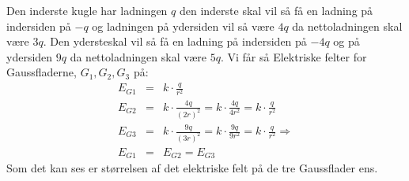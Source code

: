 Den inderste kugle har ladningen $q$ den inderste skal vil så få en ladning på indersiden på $-q$ og ladningen på ydersiden vil så være $4q$ da nettoladningen skal være $3q$. Den ydersteskal vil så få en ladning på indersiden på $-4q$ og på ydersiden $9q$ da nettoladningen skal være $5q$. Vi får så Elektriske felter for Gaussfladerne, $G_1, G_2, G_3$ på:
\begin{eqnarray}
	E_{G1} &=& k \cdot \frac{q}{r^2} \nonumber \\
	E_{G2} &=& k \cdot \frac{4q}{(2r)^2} = k \cdot \frac{4q}{4r^2} = k \cdot \frac{q}{r^2} \nonumber \\
	E_{G3} &=& k \cdot \frac{9q}{(3r)^2} = k \cdot \frac{9q}{9r^2} = k \cdot \frac{q}{r^2} \nonumber \Rightarrow \\
	E_{G1} &=& E_{G2} = E_{G3}
\end{eqnarray}
Som det kan ses er størrelsen af det elektriske felt på de tre Gaussflader ens.
